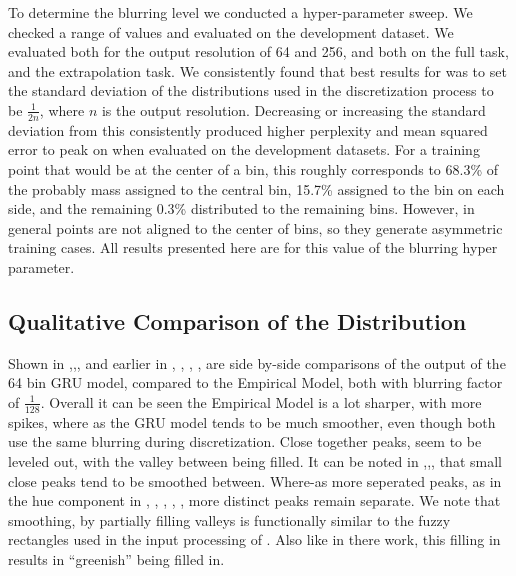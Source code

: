 \documentclass[11pt,letterpaper]{article}
\newcommand{\textcite}{\newcite}
\begin{document}
To determine the blurring level we conducted a hyper-parameter sweep.
We checked a range of values and evaluated on the development dataset.
We evaluated both for the output resolution of 64 and 256,
and both on the full task, and the extrapolation task.
We consistently found that best results for was to set the standard deviation of the distributions used in the discretization process to be $\frac{1}{2n}$, where $n$ is the output resolution.
Decreasing or increasing the standard deviation from this consistently produced higher perplexity and mean squared error to peak on when evaluated on the development datasets.
For a training point that would be at the center of a bin, this roughly corresponds to 68.3\% of the probably mass assigned to the central bin, 15.7\% assigned to the bin on each side, and the remaining 0.3\% distributed to the remaining bins.
However, in general points are not aligned to the center of bins, so they generate asymmetric training cases.
All results presented here are for this value of the blurring hyper parameter.






\subsection{Qualitative Comparison of the Distribution}



Shown in ,,, and earlier in , , , ,  are side by-side comparisons of the output of the 64 bin GRU model, compared to the Empirical Model, both with blurring factor of $\frac{1}{128}$.
Overall it can be seen the Empirical Model is a lot sharper, with more spikes,
where as the GRU model tends to be much smoother, even though both use the same blurring during discretization.
Close together peaks, seem to be leveled out, with the valley between being filled.
It can be noted in ,,, that small close peaks tend to be smoothed between.
Where-as more seperated peaks, as in the hue component in , , , , , more distinct peaks remain separate.
We note that smoothing, by partially filling valleys is functionally similar to the fuzzy rectangles used in the input processing of \textcite{mcmahan2015bayesian}.
Also like in there work, this filling in results in ``greenish'' being filled in.
\end{document}
